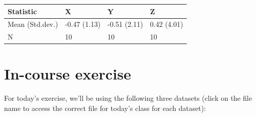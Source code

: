 \documentclass[]{book}
\makeatletter
\newenvironment{Shaded}{\begin{snugshade}}{\end{snugshade}}
\newcommand{\KeywordTok}[1]{\textcolor[rgb]{0.13,0.29,0.53}{\textbf{{#1}}}}
\newcommand{\DataTypeTok}[1]{\textcolor[rgb]{0.13,0.29,0.53}{{#1}}}
\newcommand{\DecValTok}[1]{\textcolor[rgb]{0.00,0.00,0.81}{{#1}}}
\newcommand{\StringTok}[1]{\textcolor[rgb]{0.31,0.60,0.02}{{#1}}}
\newcommand{\NormalTok}[1]{{#1}}
\newenvironment{kframe}{%
\medskip{}
\setlength{\fboxsep}{.8em}
 \def\at@end@of@kframe{}%
 \ifinner\ifhmode%
  \def\at@end@of@kframe{\end{minipage}}%
  \begin{minipage}{\columnwidth}%
 \fi\fi%
 \def\FrameCommand##1{\hskip\@totalleftmargin \hskip-\fboxsep
 \colorbox{shadecolor}{##1}\hskip-\fboxsep
     \hskip-\linewidth \hskip-\@totalleftmargin \hskip\columnwidth}%
 \MakeFramed {\advance\hsize-\width
   \@totalleftmargin\z@ \linewidth\hsize
   \@setminipage}}%
 {\par\unskip\endMakeFramed%
 \at@end@of@kframe}
\renewenvironment{Shaded}{\begin{kframe}}{\end{kframe}}
\makeatother
\begin{document}
\begin{Shaded}
\end{Shaded}

\begin{tabular}{l|l|l|l}
\hline
Statistic & X & Y & Z\\
\hline
Mean (Std.dev.) & -0.47 (1.13) & -0.51 (2.11) & 0.42 (4.01)\\
\hline
N & 10 & 10 & 10\\
\hline
\end{tabular}

\section{In-course exercise}\label{in-course-exercise-5}

For today's exercise, we'll be using the following three datasets (click
on the file name to access the correct file for today's class for each
dataset):
\end{document}
